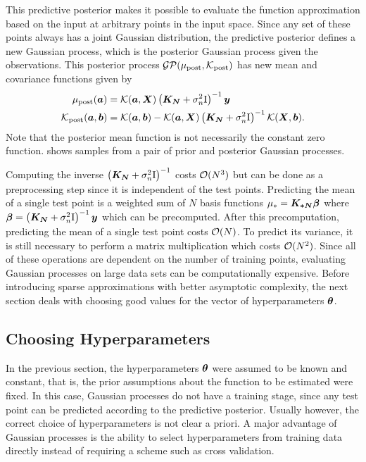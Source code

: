 This predictive posterior makes it possible to evaluate the function approximation based on the input at arbitrary points in the input space.
Since any set of these points always has a joint Gaussian distribution, the predictive posterior defines a new Gaussian process, which is the posterior Gaussian process given the observations.
This posterior process $\operatorname{\mathcal{GP}}(\mu_\text{post}, \operatorname{\mathcal{K}}_\text{post})$ has new mean and covariance functions given by
\begin{align}
    \begin{split}
        \mu_\text{post}(\bm{a}) &= \operatorname{\mathcal{K}}(\bm{a}, \bm{X}) \left(\bm{K_N} + \sigma_n^2 \mathrm{I} \right)^{-1} \bm{y} \\
        \operatorname{\mathcal{K}}_\text{post}(\bm{a}, \bm{b}) &= \operatorname{\mathcal{K}}(\bm{a}, \bm{b}) - \operatorname{\mathcal{K}}(\bm{a}, \bm{X}) \left( \bm{K_N} + \sigma_n^2 \mathrm{I} \right)^{-1} \operatorname{\mathcal{K}}(\bm{X}, \bm{b}).
    \end{split}
\end{align}
Note that the posterior mean function is not necessarily the constant zero function.
 shows samples from a pair of prior and posterior Gaussian processes.

Computing the inverse $\left(\bm{K_N} + \sigma_n^2 \mathrm{I} \right)^{-1}$ costs $\operatorname{\mathcal{O}}(N^3)$ but can be done as a preprocessing step since it is independent of the test points.
Predicting the mean of a single test point is a weighted sum of $N$ basis functions $\mu_\ast = \bm{K_{\ast N}} \bm{\beta}$ where $\bm{\beta} = \left(\bm{K_N} + \sigma_n^2 \mathrm{I} \right)^{-1} \bm{y}$ which can be precomputed.
After this precomputation, predicting the mean of a single test point costs $\operatorname{\mathcal{O}}(N)$.
To predict its variance, it is still necessary to perform a matrix multiplication which costs $\operatorname{\mathcal{O}}(N^2)$.
Since all of these operations are dependent on the number of training points, evaluating Gaussian processes on large data sets can be computationally expensive.
Before introducing sparse approximations with better asymptotic complexity, the next section deals with choosing good values for the vector of hyperparameters $\bm{\theta}$.

\subsection{Choosing Hyperparameters}
\label{sub:gp_hyperparameters}
In the previous section, the hyperparameters $\bm{\theta}$ were assumed to be known and constant, that is, the prior assumptions about the function to be estimated were fixed.
In this case, Gaussian processes do not have a training stage, since any test point can be predicted according to the predictive posterior.
Usually however, the correct choice of hyperparameters is not clear a priori.
A major advantage of Gaussian processes is the ability to select hyperparameters from training data directly instead of requiring a scheme such as cross validation.


